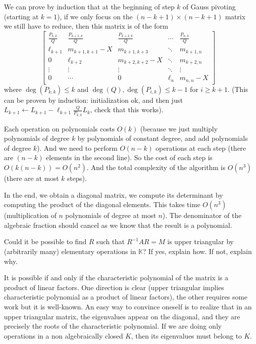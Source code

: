 \documentclass[11pt]{exam}
\theoremstyle{definition}
\begin{document}
{\begin{questions}
\begin{solution}
		We can prove by induction that at the beginning of step $k$ of Gauss pivoting (starting at $k = 1$), if we only focus on the $(n-k+1) \times (n-k+1)$ matrix we still have to reduce, then this matrix is of the form
		$$ \begin{bmatrix} \frac{P_{k,k}}{Q} & \frac{P_{k+1,k}}{Q} & \frac{P_{k+2,k}}{Q} & \cdots & \frac{P_{n,k}}{Q} \\
		\ell_{k+1} & m_{{k+1},{k+1}}-X & m_{{k+1},{k+3}} & \ddots & m_{{k+1},n} \\
		0 & \ell_{k+2} & m_{{k+2},{k+2}}-X & \ddots & m_{{k+2},n} \\
		\vdots & \vdots & \vdots & \ddots & \vdots \\
		0 & \cdots & 0 & \ell_n & m_{n,n}-X
		\end{bmatrix}$$
		where $\deg(P_{k,k}) \leq k$ and $\deg(Q), \deg(P_{i,k}) \leq k-1$ for $i \geq k+1$.
		(This can be proven by induction: initialization ok, and then just $L_{k+1} \leftarrow L_{k+1} - \ell_{k+1} \frac{Q}{P_{k,k}} L_{k}$, check that this works).
		
		Each operation on polynomials costs $O(k)$ (because we just multiply polynomials of degree $k$ by polynomials of constant degree, and add polynomials of degree $k$). And we need to perform $O(n-k)$ operations at each step (there are $(n-k)$ elements in the second line). So the cost of each step is $O(k(n-k)) = O(n^2)$. And the total complexity of the algorithm is $O(n^3)$ (there are at most $k$ steps).
		
		In the end, we obtain a diagonal matrix, we compute its determinant by computing the product of the diagonal elements. This takes time $O(n^3)$ (multiplication of $n$ polynomials of degree at most $n$). The denominator of the algebraic fraction should cancel as we know that the result is a polynomial.
	\end{solution}
	
	\question 
	\label{no_diag}
	Could it be possible to find $R$ such that $R^{-1}AR=M$ is upper triangular by (arbitrarily many) elementary operations in $\mathbb{K}$? If yes, explain how. If not, explain why.
	
	\begin{solution}
          It is possible if and only if the characteristic polynomial of the matrix is a product of linear factors. One direction is clear (upper triangular implies characteristic polynomial as a product of linear factors), the other requires some work but it is well-known. An easy way to convince oneself is to realize that in an upper triangular matrix, the eigenvalues appear on the diagonal, and they are precisely the roots of the characteristic polynomial. If we are doing only operations in a non algebraically closed $K$, then its eigenvalues must belong to $K$.


\end{solution}
\end{questions}}
\end{document}
